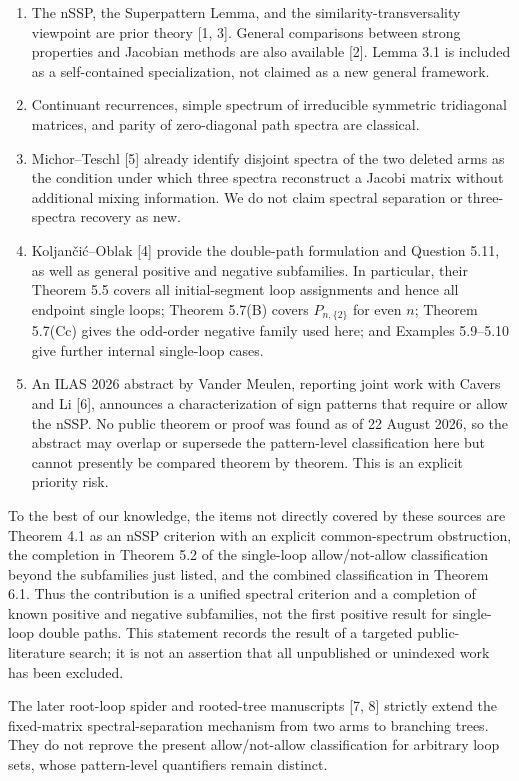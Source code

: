 \documentclass[11pt]{article}
\theoremstyle{remark}
\begin{document}
\begin{enumerate}
\item The nSSP, the Superpattern Lemma, and the similarity-transversality viewpoint are prior theory
   [1, 3]. General comparisons between strong properties and Jacobian methods are also available [2].
   Lemma 3.1 is included as a self-contained specialization, not claimed as a new general framework.
\item Continuant recurrences, simple spectrum of irreducible symmetric tridiagonal matrices, and parity of
   zero-diagonal path spectra are classical.
\item Michor--Teschl [5] already identify disjoint spectra of the two deleted arms as the condition under
   which three spectra reconstruct a Jacobi matrix without additional mixing information. We do not
   claim spectral separation or three-spectra recovery as new.
\item Koljan\v{c}i\'{c}--Oblak [4] provide the double-path formulation and Question 5.11, as well as general
   positive and negative subfamilies. In particular, their Theorem 5.5 covers all initial-segment loop
   assignments and hence all endpoint single loops; Theorem 5.7(B) covers $P_{n,\{2\}}$ for even
   $n$; Theorem 5.7(Cc) gives the odd-order negative family used here; and Examples 5.9--5.10 give
   further internal single-loop cases.
\item An ILAS 2026 abstract by Vander Meulen, reporting joint work with Cavers and Li [6], announces a
   characterization of sign patterns that require or allow the nSSP.  No public theorem or proof was
   found as of 22 August 2026, so the abstract may overlap or supersede the pattern-level classification
   here but cannot presently be compared theorem by theorem.  This is an explicit priority risk.
\end{enumerate}
To the best of our knowledge, the items not directly covered by these sources are Theorem 4.1 as an nSSP
criterion with an explicit common-spectrum obstruction, the completion in Theorem 5.2 of the single-loop
allow/not-allow classification beyond the subfamilies just listed, and the combined classification in
Theorem 6.1. Thus the contribution is a unified spectral criterion and a completion of known positive and
negative subfamilies, not the first positive result for single-loop double paths. This statement records
the result of a targeted public-literature search; it is not an assertion that all unpublished or
unindexed work has been excluded.

The later root-loop spider and rooted-tree manuscripts [7, 8] strictly extend the fixed-matrix
spectral-separation mechanism from two arms to branching trees.  They do not reprove the present
allow/not-allow classification for arbitrary loop sets, whose pattern-level quantifiers remain distinct.
\end{document}
